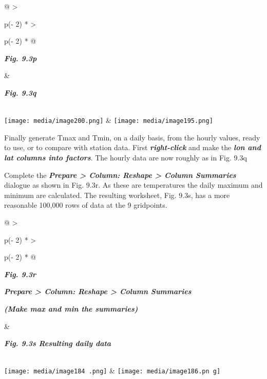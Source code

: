 \documentclass[
  letterpaper,
  DIV=11,
  numbers=noendperiod]{scrreprt}
\begin{document}
\begin{longtable}[]{@{}
  >{\raggedright\arraybackslash}p{(\columnwidth - 2\tabcolsep) * }
  >{\raggedright\arraybackslash}p{(\columnwidth - 2\tabcolsep) * }@{}}
\toprule\noalign{}
\begin{minipage}[b]{\linewidth}\raggedright
\textbf{\emph{Fig. 9.3p}}
\end{minipage} & \begin{minipage}[b]{\linewidth}\raggedright
\textbf{\emph{Fig. 9.3q}}
\end{minipage} \\
\midrule\noalign{}
\endhead
\bottomrule\noalign{}
\endlastfoot
\texttt{[image: media/image200.png]} &
\texttt{[image: media/image195.png]} \\
\end{longtable}

Finally generate Tmax and Tmin, on a daily basis, from the hourly
values, ready to use, or to compare with station data. First
\textbf{\emph{right-click}} and make the \textbf{\emph{lon and lat
columns into factors}}. The hourly data are now roughly as in Fig. 9.3q

Complete the \textbf{\emph{Prepare \textgreater{} Column: Reshape
\textgreater{} Column Summaries}} dialogue as shown in Fig. 9.3r. As
these are temperatures the daily maximum and minimum are calculated. The
resulting worksheet, Fig. 9.3s, has a more reasonable 100,000 rows of
data at the 9 gridpoints.

\begin{longtable}[]{@{}
  >{\raggedright\arraybackslash}p{(\columnwidth - 2\tabcolsep) * }
  >{\raggedright\arraybackslash}p{(\columnwidth - 2\tabcolsep) * }@{}}
\toprule\noalign{}
\begin{minipage}[b]{\linewidth}\raggedright
\textbf{\emph{Fig. 9.3r}}

\textbf{\emph{Prepare \textgreater{} Column: Reshape \textgreater{}
Column Summaries}}

\textbf{\emph{(Make max and min the summaries)}}
\end{minipage} & \begin{minipage}[b]{\linewidth}\raggedright
\textbf{\emph{Fig. 9.3s Resulting daily data}}
\end{minipage} \\
\midrule\noalign{}
\endhead
\bottomrule\noalign{}
\endlastfoot
\texttt{[image: media/image184 .png]}
&
\texttt{[image: media/image186.pn g]} \\
\end{longtable}
\end{document}
